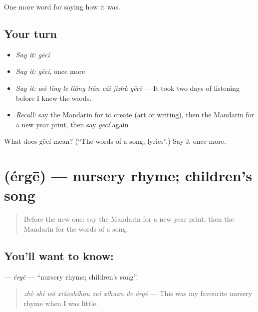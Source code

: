 \begin{grammarlens}[title={What you've built}]
One more word for saying how it was.
\end{grammarlens}

\subsection*{Your turn}
\begin{itemize}
\raggedright
  \item \emph{Say it:} \emph{gēcí}
  \item \emph{Say it:} \emph{gēcí}, once more
  \item \emph{Say it:} \emph{wǒ tīng le liǎng tiān cái jìzhù gēcí} — It took two days of listening before I knew the words.
  \item \emph{Recall:} say the Mandarin for to create (art or writing), then the Mandarin for a new year print, then say \emph{gēcí} again
\end{itemize}

\begin{tcolorbox}[breakable,colback=teal!4,colframe=teal!35!black,title={Before you move on}]
What does gēcí mean? (\textquotedblleft{}The words of a song; lyrics\textquotedblright{}.) Say it once more.
\end{tcolorbox}
\section[\texorpdfstring{\zh{儿歌} (érgē)}{儿歌 (érgē)}]{ (érgē) — nursery rhyme; children's song}

\label{lesson:ZH-C504-erge}



\begin{quote}
Before the new one: say the Mandarin for a new year print, then the Mandarin for the words of a song.
\end{quote}

\subsection*{You'll want to know: }
\textbf{} — \emph{érgē} — \textquotedblleft{}nursery rhyme; children's song\textquotedblright{}.

\begin{quote}
\textbf{} \emph{zhè shì wǒ xiǎoshíhou zuì xǐhuan de érgē} — This was my favourite nursery rhyme when I was little.
\end{quote}

